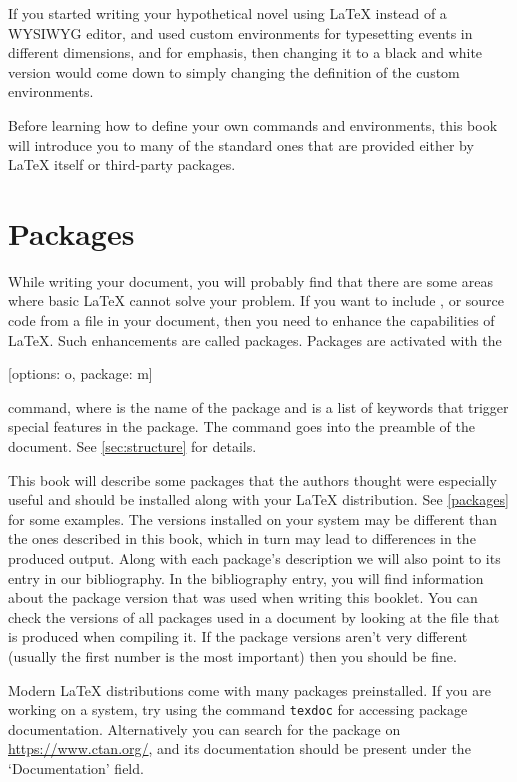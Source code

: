 If you started writing your hypothetical novel using \LaTeX{} instead of a
WYSIWYG editor, and used custom environments for typesetting events in different
dimensions, and  for emphasis, then changing it to a black and white
version would come down to simply changing the definition of the custom
environments.

Before learning how to define your own commands and environments, this book
will introduce you to many of the standard ones that are provided either by
\LaTeX{} itself or third-party packages.

\section{Packages} While writing your document, you will
probably find that there are some areas where basic \LaTeX{} cannot solve your
problem. If you want to include ,  or source
code from a file in your document, then you need to enhance the capabilities of
\LaTeX. Such enhancements are called packages. Packages are activated with the
\begin{lscommand}
  [options: o, package: m]
\end{lscommand}
command, where  is the name of the package and
 is a list of keywords that trigger special features in
the package. The  command goes into the preamble of the
document. See \autoref{sec:structure} for details.

This book will describe some packages that the authors thought were especially
useful and should be installed along with your \LaTeX{} distribution. See
\autoref{packages} for some examples. The versions installed on your system may
be different than
the ones described in this book, which in turn may lead to differences in the
produced output. Along with each package's description we will also point
to its entry in our bibliography. In the bibliography entry, you will find
information about the package version that was used when writing this booklet.
You can check the versions of all packages used in a document by looking
at the  file that is produced when compiling it. If the
package versions aren't very different (usually the first number is the most
important) then you should be fine.

Modern \LaTeX{} distributions come with many packages
preinstalled. If you are working on a \Unix{} system, try using the command
\texttt{texdoc} for accessing package documentation. Alternatively you can
search for the package on \url{https://www.ctan.org/}, and its documentation
should be present under the \enquote*{Documentation} field.

